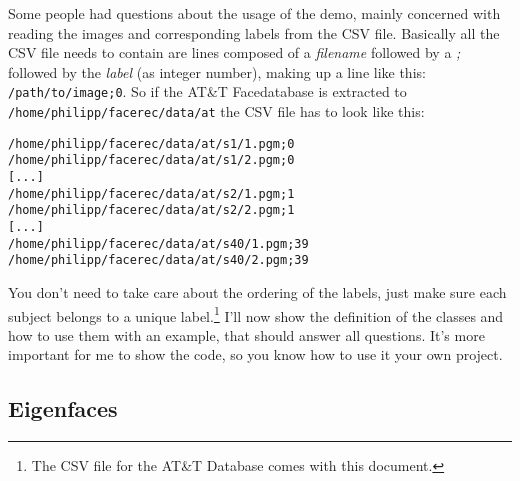 Some people had questions about the usage of the demo, mainly concerned with reading the images and corresponding labels from the CSV file. Basically all the CSV file needs to contain are lines composed of a \textit{filename} followed by a \textit{;} followed by the \textit{label} (as integer number), making up a line like this: \lstinline|/path/to/image;0|. So if the AT\&T Facedatabase is extracted to \lstinline|/home/philipp/facerec/data/at| the CSV file has to look like this:

\begin{lstlisting}
/home/philipp/facerec/data/at/s1/1.pgm;0
/home/philipp/facerec/data/at/s1/2.pgm;0
[...]
/home/philipp/facerec/data/at/s2/1.pgm;1
/home/philipp/facerec/data/at/s2/2.pgm;1
[...]
/home/philipp/facerec/data/at/s40/1.pgm;39
/home/philipp/facerec/data/at/s40/2.pgm;39
\end{lstlisting}

You don't need to take care about the ordering of the labels, just make sure each subject belongs to a unique label.\footnote{The CSV file for the AT\&T Database comes with this document.} I'll now show the definition of the classes and how to use them with an example, that should answer all questions. It's more important for me to show the code, so you know how to use it your own project.

\subsection{Eigenfaces}

